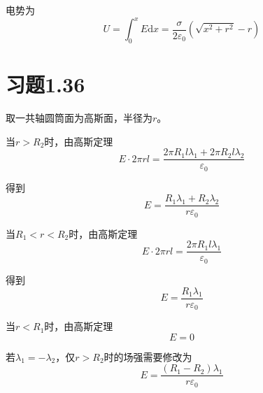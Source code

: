 \documentclass{SCIS2020cn}
\begin{document}
电势为
\begin{equation}
    U=\int_0^xE\text{d}x=\frac{\sigma}{2\varepsilon_0}(\sqrt{x^2+r^2}-r)
\end{equation}

\section{习题1.36}
取一共轴圆筒面为高斯面，半径为$r$。

当$r>R_2$时，由高斯定理
\begin{equation}
    E·2\pi{}rl=\frac{2\pi{}R_1l\lambda_1+2\pi{}R_2l\lambda_2}{\varepsilon_0}
\end{equation}

得到
\begin{equation}
    E=\frac{R_1\lambda_1+R_2\lambda_2}{r\varepsilon_0}
\end{equation}

当$R_1<r<R_2$时，由高斯定理
\begin{equation}
    E·2\pi{}rl=\frac{2\pi{}R_1l\lambda_1}{\varepsilon_0}
\end{equation}

得到
\begin{equation}
    E=\frac{R_1\lambda_1}{r\varepsilon_0}
\end{equation}

当$r<R_1$时，由高斯定理
\begin{equation}
    E=0
\end{equation}

若$\lambda_1=-\lambda_2$，仅$r>R_2$时的场强需要修改为
\begin{equation}
    E=\frac{(R_1-R_2)\lambda_1}{r\varepsilon_0}
\end{equation}
\end{document}
